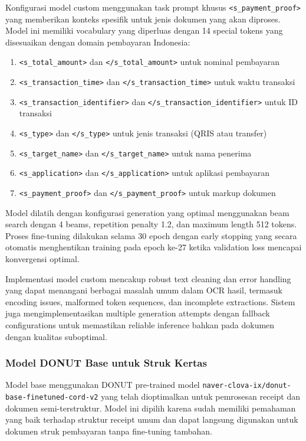 Konfigurasi model custom menggunakan task prompt khusus \texttt{<s\_payment\_proof>} yang memberikan konteks spesifik untuk jenis dokumen yang akan diproses. Model ini memiliki vocabulary yang diperluas dengan 14 special tokens yang disesuaikan dengan domain pembayaran Indonesia:
\begin{enumerate}
    \item \texttt{<s\_total\_amount>} dan \texttt{</s\_total\_amount>} untuk nominal pembayaran
    \item \texttt{<s\_transaction\_time>} dan \texttt{</s\_transaction\_time>} untuk waktu transaksi
    \item \texttt{<s\_transaction\_identifier>} dan \texttt{</s\_transaction\_identifier>} untuk ID transaksi
    \item \texttt{<s\_type>} dan \texttt{</s\_type>} untuk jenis transaksi (QRIS atau transfer)
    \item \texttt{<s\_target\_name>} dan \texttt{</s\_target\_name>} untuk nama penerima
    \item \texttt{<s\_application>} dan \texttt{</s\_application>} untuk aplikasi pembayaran
    \item \texttt{<s\_payment\_proof>} dan \texttt{</s\_payment\_proof>} untuk markup dokumen
\end{enumerate}

Model dilatih dengan konfigurasi generation yang optimal menggunakan beam search dengan 4 beams, repetition penalty 1.2, dan maximum length 512 tokens. Proses fine-tuning dilakukan selama 30 epoch dengan early stopping yang secara otomatis menghentikan training pada epoch ke-27 ketika validation loss mencapai konvergensi optimal.

Implementasi model custom mencakup robust text cleaning dan error handling yang dapat menangani berbagai masalah umum dalam OCR hasil, termasuk encoding issues, malformed token sequences, dan incomplete extractions. Sistem juga mengimplementasikan multiple generation attempts dengan fallback configurations untuk memastikan reliable inference bahkan pada dokumen dengan kualitas suboptimal.

\subsubsection{Model DONUT Base untuk Struk Kertas}
\label{subsubsec:model-base}

Model base menggunakan DONUT pre-trained model \texttt{naver-clova-ix/donut-base-finetuned-cord-v2} yang telah dioptimalkan untuk pemrosesan receipt dan dokumen semi-terstruktur. Model ini dipilih karena sudah memiliki pemahaman yang baik terhadap struktur receipt umum dan dapat langsung digunakan untuk dokumen struk pembayaran tanpa fine-tuning tambahan.

